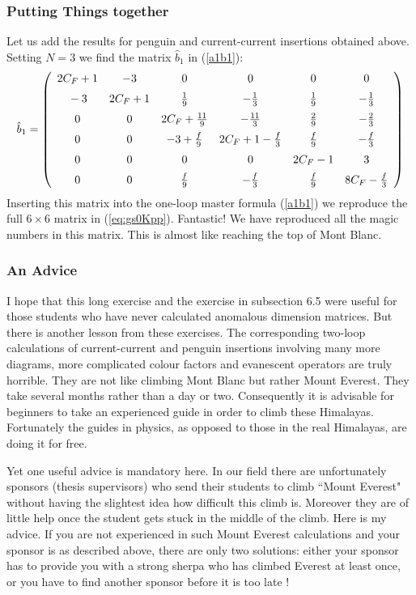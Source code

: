 \documentclass[12pt,rotate]{article}
\newcommand{\svs}{\vbox{\vskip 5mm}}
\begin{document}
\begin{itemize}
\begin{itemize}
\subsubsection{Putting Things together}
Let us add the results for penguin and current-current insertions 
obtained above. Setting $N=3$ we find the matrix $\hat b_1$ in
(\ref{a1b1}):
\begin{equation} 
\hat b_1 =  
\left( 
\begin{array}{cccccc} 
2 C_F +1 & -3 & 0 & 0 & 0 & 0 \\ \svs 
 -3 & 2C_F +1 & {{1}\over {9}} & -{1\over 3} & {{1}\over {9}} & 
  -{1\over 3} \\ \svs 
0 & 0 &  2C_F+\frac{11}{9} & -{{11}\over 3} & {{2}\over {9}}  
& -{2\over 3} \\ \svs 
0 & 0 & {-3 +{f\over 9}} & 2C_F+1 -\frac{f}{3}  
& {{f}\over {9}} & -{{f}\over 3} \\ \svs 
0 & 0 & 0 & 0 & 2C_F-1 & 3  \\ \svs 
0 & 0 & {{f}\over {9}} & -{{f}\over 3} & {{f}\over {9}} &  
8C_F - \frac{f}{3} 
\end{array} 
\right) 
\label{bhat} 
\end{equation}
Inserting this matrix into the one-loop master formula (\ref{a1b1}) 
we reproduce
the full $6\times 6$ matrix in (\ref{eq:gs0Kpp}). 
Fantastic! We have reproduced all the magic numbers 
in this matrix. This is almost like reaching the top of
Mont Blanc.

\subsubsection{An Advice}
I hope that this long exercise and the exercise in subsection 6.5 were
useful for those students who have never calculated anomalous dimension
matrices.
But there is another lesson from these exercises. The corresponding
two-loop calculations of current-current and penguin insertions 
involving many more diagrams, more complicated colour factors and
evanescent operators are truly horrible. They are not like climbing
Mont Blanc but rather Mount Everest. They take several months rather
than a day or two. Consequently it is advisable for beginners to
take an experienced guide in order to climb these Himalayas.
Fortunately the guides in physics, as opposed to those in the real
Himalayas, are doing it for free. 

Yet one useful advice
is mandatory here. In our field there are unfortunately sponsors
(thesis supervisors) who send  their students to climb ``Mount Everest"
without having the slightest idea how difficult this climb is. Moreover
they are of little help once the student gets stuck in the middle of the
climb. Here is my advice. If you are not experienced in such Mount
Everest calculations and your sponsor is as described above, there
are only two solutions: either your sponsor has to provide you with
a strong sherpa who has climbed  Everest at least once, or you have 
to find another sponsor before it is too late \cite{Krakauer}!


\end{itemize}
\end{itemize}
\end{document}
